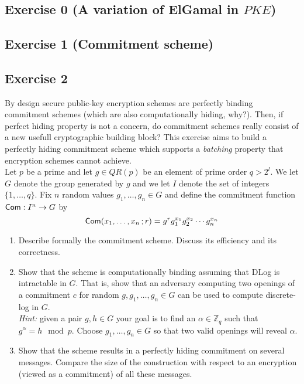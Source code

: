 
\section{}
\subsection{Exercise 0 (A variation of ElGamal in \texorpdfstring{$PKE$}{PKE})}

\subsection{Exercise 1 (Commitment scheme)}

\subsection{Exercise 2}
By design secure public-key encryption schemes are perfectly binding commitment schemes (which are also computationally hiding, why?). 
Then, if perfect hiding property is not a concern, do commitment schemes really consist of a new usefull cryptographic building block? 
This exercise aims to build a perfectly hiding commitment scheme which supports a \emph{batching} property that encryption schemes
cannot achieve. \medskip \\
Let $p$ be a prime and let $g \in QR(p)$ be an element of prime order $q>2^l$. 
We let $G$ denote the group generated by $g$ and we let $I$ denote the set of integers $\{1,\dots, q\}$. 
Fix $n$ random values $g_1,\dots, g_n \in G$ and define the commitment function $\operatorname{\mathsf{Com}} : I^n \rightarrow G$ by 
$$\operatorname{\mathsf{Com}}(x_1,\dots, x_n\,; r) = g^r g_1^{x_1}g_2^{x_2}\cdots g_n^{x_n}$$
\begin{enumerate}
  \item Describe formally the commitment scheme. Discuss its efficiency and its correctness.
	\item Show that the scheme is computationally binding assuming that DLog is intractable in $G$. 
	      That is, show that an adversary computing two openings of a commitment $c$ for random 
				$g,g_1,\dots, g_n \in G$ can be used to compute discrete-log in $G$.\\
				\emph{Hint:} given a pair $g, h \in G$ your goal is to find an $\alpha \in \mathbb{Z}_q$ such that $g^\alpha = h \mod p$. 
				             Choose $g_1,\dots, g_n \in G$ so that two valid openings will reveal $\alpha$.
	\item Show that the scheme results in a perfectly hiding commitment on several messages. Compare the size of the construction
	      with respect to an encryption (viewed as a commitment) of all these messages.
\end{enumerate}


